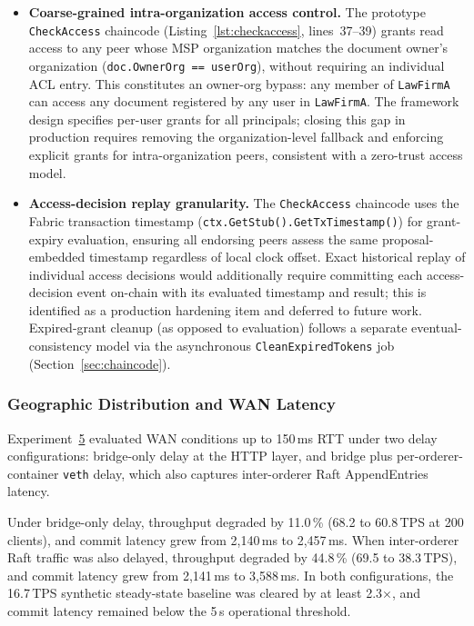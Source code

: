 \documentclass{ieeeaccess}
\begin{document}
\begin{itemize}
\item \textbf{Coarse-grained intra-organization access control.}
The prototype \texttt{CheckAccess} chaincode (Listing~\ref{lst:checkaccess},
lines~37--39) grants read access to any peer whose MSP organization
matches the document owner's organization
(\texttt{doc.OwnerOrg == userOrg}), without requiring an individual
ACL entry. This constitutes an owner-org bypass: any member of
\texttt{LawFirmA} can access any document registered by any user in
\texttt{LawFirmA}. The framework design specifies per-user grants for
all principals; closing this gap in production requires removing the
organization-level fallback and enforcing explicit grants for
intra-organization peers, consistent with a zero-trust access model.

\item \textbf{Access-decision replay granularity.}
The \texttt{CheckAccess} chaincode uses the Fabric transaction timestamp
(\texttt{ctx.GetStub().GetTxTimestamp()}) for grant-expiry evaluation,
ensuring all endorsing peers assess the same proposal-embedded timestamp
regardless of local clock offset. Exact historical replay of individual
access decisions would additionally require committing each
access-decision event on-chain with its evaluated timestamp and result;
this is identified as a production hardening item and deferred to future
work. Expired-grant cleanup (as opposed to evaluation) follows a separate
eventual-consistency model via the asynchronous \texttt{CleanExpiredTokens}
job (Section~\ref{sec:chaincode}).
\end{itemize}

\subsubsection{Geographic Distribution and WAN Latency}
Experiment~\hyperref[sec:exp_wan]{5} evaluated WAN conditions up to 150\,ms RTT under two delay
configurations: bridge-only delay at the HTTP layer, and bridge plus
per-orderer-container \texttt{veth} delay, which also captures inter-orderer
Raft AppendEntries latency.

Under bridge-only delay, throughput degraded by 11.0\,\% (68.2 to
60.8\,TPS at 200 clients), and commit latency grew from 2,140\,ms to
2,457\,ms. When inter-orderer Raft traffic was also delayed, throughput
degraded by 44.8\,\% (69.5 to 38.3\,TPS), and commit latency grew from
2,141\,ms to 3,588\,ms. In both configurations, the 16.7\,TPS synthetic
steady-state baseline was cleared by at least 2.3$\times$, and commit
latency remained below the 5\,s operational threshold.
\end{document}
